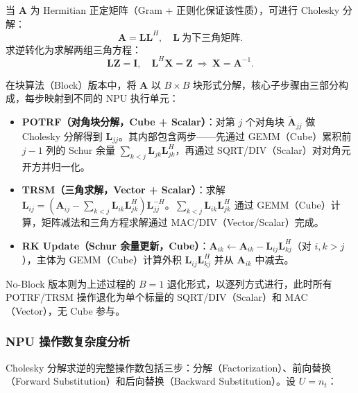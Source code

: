\documentclass{CjC}
\begin{document}
    当 $\bm{A}$ 为 Hermitian 正定矩阵（Gram + 正则化保证该性质），可进行
    Cholesky 分解：
    \begin{equation}
        \bm{A}=\bm{L}\bm{L}^{H},\quad \bm{L}\ \text{为下三角矩阵}.
    \end{equation}
    求逆转化为求解两组三角方程：
    \begin{equation}
        \bm{L}\bm{Z}=\bm{I},\quad \bm{L}^{H}\bm{X}=\bm{Z}\ \Rightarrow\ \bm{X}=\bm
        {A}^{-1}.
    \end{equation}

    在块算法（Block）版本中，将 $\bm{A}$ 以 $B\times B$ 块形式分解，核心子步骤由三部分构成，每步映射到不同的
    NPU 执行单元：
    \begin{itemize}
        \item \textbf{POTRF（对角块分解，Cube + Scalar）}：对第 $j$ 个对角块 $\tilde
            {\bm{A}}_{jj}$ 做 Cholesky 分解得到 $\bm{L}_{jj}$。其内部包含两步——先通过
            GEMM（Cube）累积前 $j-1$ 列的 Schur 余量
            $\sum_{k<j}\bm{L}_{jk}\bm{L}_{jk}^{H}$，再通过 SQRT/DIV（Scalar）对对角元开方并归一化。

        \item \textbf{TRSM（三角求解，Vector + Scalar）}：求解 $\bm{L}_{ij}=(\bm{A}
            _{ij}-\sum_{k<j}\bm{L}_{ik}\bm{L}_{jk}^{H})\bm{L}_{jj}^{-H}$。$\sum_{k<j}
            \bm{L}_{ik}\bm{L}_{jk}^{H}$ 通过 GEMM（Cube）计算，矩阵减法和三角方程求解通过
            MAC/DIV（Vector/Scalar）完成。

        \item \textbf{RK Update（Schur 余量更新，Cube）}：$\bm{A}_{ik}\leftarrow
            \bm{A}_{ik}-\bm{L}_{ij}\bm{L}_{kj}^{H}$（对 $i,k>j$），主体为
            GEMM（Cube）计算外积 $\bm{L}_{ij}\bm{L}_{kj}^{H}$ 并从 $\bm{A}_{ik}$
            中减去。
    \end{itemize}

    No-Block 版本则为上述过程的 $B=1$ 退化形式，以逐列方式进行，此时所有 POTRF/TRSM
    操作退化为单个标量的 SQRT/DIV（Scalar）和 MAC（Vector），无 Cube 参与。

    \subsubsection{NPU 操作数复杂度分析}

    Cholesky
    分解求逆的完整操作数包括三步：分解（Factorization）、前向替换（Forward
    Substitution）和后向替换（Backward Substitution）。设 $U=n_{t}$：
\end{document}
